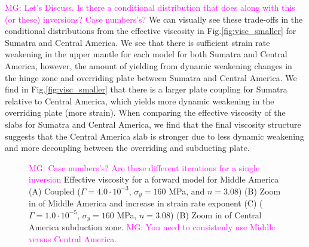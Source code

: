 \documentclass[12pt]{article}
\newcommand{\mgnote}[1]{\textcolor{magenta}{MG: #1}}
\begin{document}
\mgnote{Let's Discuss. Is there a conditional distribution that does along with this (or these) inversions? Case numbers's?}
We can visually see these trade-offs in the conditional distributions from the effective viscosity in Fig.\ref{fig:visc_smaller} for Sumatra and Central America. We see that there is sufficient strain rate weakening in the upper mantle for each model for both Sumatra and Central America, however, the amount of yielding from dynamic weakening changes in the hinge zone and overriding plate between Sumatra and Central America. We find in Fig.\ref{fig:visc_smaller} that there is a larger plate coupling for Sumatra relative to Central America, which  yields more dynamic weakening in the overriding plate (more strain). When comparing the effective viscosity of the slabs for Sumatra and Central America, we find that the final viscosity structure suggests that the Central America slab is stronger due to less dynamic weakening and more decoupling between the overriding and subducting plate. 



\begin{figure}[H]
\centering

\hspace{-1.0cm}

\hspace{0.2cm}
\caption{\mgnote{Case numbers's? Are these different iterations for a single inversion} Effective viscosity for a forward model for Middle America (A) Coupled ($\Gamma = 4.0 \cdot 10^{-3}$, $\sigma_y = 160$ MPa, and $n = 3.08$) (B) Zoom in of Middle America and increase in strain rate exponent (C) ($\Gamma = 1.0 \cdot 10^{-5}$, $\sigma_y = 160$ MPa, $n = 3.08$)
(B) Zoom in of Central America subduction zone. \mgnote{You need to consistenly use Middle versus Central America.}}
\label{fig:middle_physics}
\end{figure}
\end{document}
